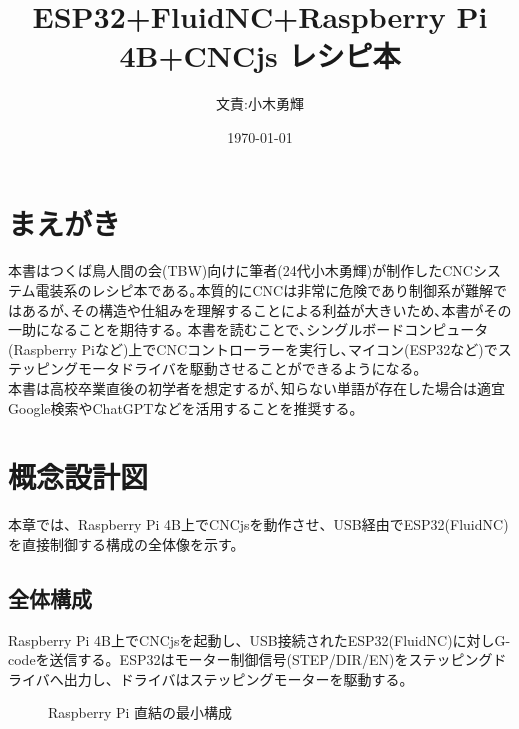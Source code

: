 \documentclass[uplatex,dvipdfmx]{ujarticle}
\begin{document}
\title{ESP32+FluidNC+Raspberry Pi 4B+CNCjs レシピ本}
\author{文責:小木勇輝}
\date{\today}
\maketitle

\tableofcontents
\newpage
\section{まえがき}

本書はつくば鳥人間の会(TBW)向けに筆者(24代小木勇輝)が制作したCNCシステム電装系のレシピ本である｡本質的にCNCは非常に危険であり制御系が難解ではあるが､その構造や仕組みを理解することによる利益が大きいため､本書がその一助になることを期待する｡
本書を読むことで､シングルボードコンピュータ(Raspberry Piなど)上でCNCコントローラーを実行し､マイコン(ESP32など)でステッピングモータドライバを駆動させることができるようになる｡\\
本書は高校卒業直後の初学者を想定するが､知らない単語が存在した場合は適宜Google検索やChatGPTなどを活用することを推奨する。


\section{概念設計図}

本章では、Raspberry Pi 4B上でCNCjsを動作させ、USB経由でESP32(FluidNC)を直接制御する構成の全体像を示す。
\subsection{全体構成}

Raspberry Pi 4B上でCNCjsを起動し、USB接続されたESP32(FluidNC)に対しG-codeを送信する。ESP32はモーター制御信号(STEP/DIR/EN)をステッピングドライバへ出力し、ドライバはステッピングモーターを駆動する。

\begin{figure}[h]
\centering
{}
\caption{Raspberry Pi 直結の最小構成}
\end{figure}
\end{document}
